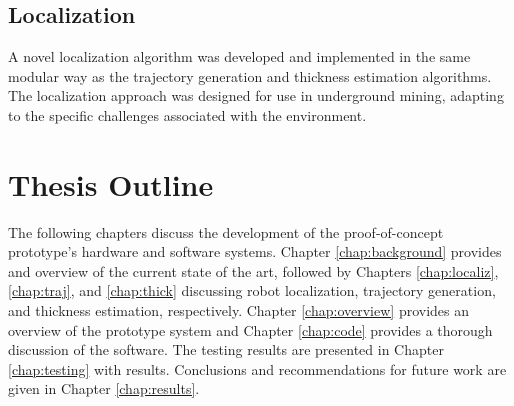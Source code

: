 \subsection{Localization}
A novel localization algorithm was developed and implemented in the same modular way as the trajectory generation and thickness estimation algorithms. The localization approach was designed for use in underground mining, adapting to the specific challenges associated with the environment.\\

\section{Thesis Outline}
\label{sec:outline}

The following chapters discuss the development of the proof-of-concept prototype's hardware and software systems. Chapter \ref{chap:background} provides and overview of the current state of the art, followed by Chapters \ref{chap:localiz}, \ref{chap:traj}, and \ref{chap:thick} discussing robot localization, trajectory generation, and thickness estimation, respectively. Chapter \ref{chap:overview} provides an overview of the prototype system and Chapter \ref{chap:code} provides a thorough discussion of the software. The testing results are presented in Chapter \ref{chap:testing} with results. Conclusions and recommendations for future work are given in Chapter \ref{chap:results}.\\